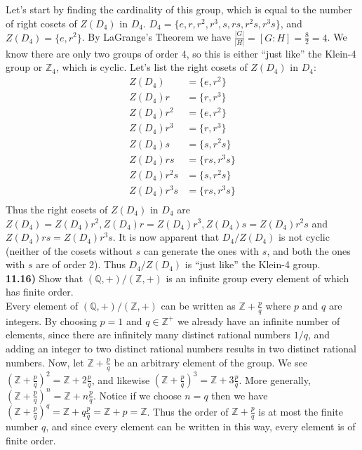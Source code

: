 \documentclass{scrartcl}
\begin{document}
Let's start by finding the cardinality of this group, which is equal to the number of right cosets of $Z(D_4)$ in $D_4$. $D_4=\{e,r,r^2,r^3,s,rs,r^2s,r^3s\}$, and $Z(D_4)=\{e,r^2\}$. By LaGrange's Theorem we have $\frac{|G|}{|H|}=[G:H]=\frac{8}{2}=4$. We know there are only two groups of order 4, so this is either ``just like'' the Klein-4 group or $\mathbb{Z}_4$, which is cyclic. Let's list the right cosets of $Z(D_4)$ in $D_4$:
\begin{align*}
Z(D_4)&=\{e,r^2\}\\
Z(D_4)r&=\{r,r^3\}\\
Z(D_4)r^2&=\{e,r^2\}\\
Z(D_4)r^3&=\{r,r^3\}\\
Z(D_4)s&=\{s,r^2s\}\\
Z(D_4)rs&=\{rs,r^3s\}\\
Z(D_4)r^2s&=\{s,r^2s\}\\
Z(D_4)r^3s&=\{rs,r^3s\}\\
\end{align*}
Thus the right cosets of $Z(D_4)$ in $D_4$ are $Z(D_4)=Z(D_4)r^2, Z(D_4)r=Z(D_4)r^3, Z(D_4)s=Z(D_4)r^2s$ and $Z(D_4)rs=Z(D_4)r^3s$. It is now apparent that $D_4/Z(D_4)$ is not cyclic (neither of the cosets without $s$ can generate the ones with $s$, and both the ones with $s$ are of order 2). Thus $D_4/Z(D_4)$ is ``just like'' the Klein-4 group.\\

\textbf{11.16)} Show that $(\mathbb{Q},+)/(\mathbb{Z},+)$ is an infinite group every element of which has finite order.\\

Every element of $(\mathbb{Q},+)/(\mathbb{Z},+)$ can be written as $\mathbb{Z}+\frac{p}{q}$ where $p$ and $q$ are integers. By choosing $p=1$ and $q \in \mathbb{Z}^+$ we already have an infinite number of elements, since there are infinitely many distinct rational numbers $1/q$, and adding an integer to two distinct rational numbers results in two distinct rational numbers. Now, let $\mathbb{Z}+\frac{p}{q}$ be an arbitrary element of the group. We see $(\mathbb{Z}+\frac{p}{q})^2=\mathbb{Z}+2\frac{p}{q}$, and likewise $(\mathbb{Z}+\frac{p}{q})^3=\mathbb{Z}+3\frac{p}{q}$. More generally, $(\mathbb{Z}+\frac{p}{q})^n=\mathbb{Z}+n\frac{p}{q}$. Notice if we choose $n=q$ then we have $(\mathbb{Z}+\frac{p}{q})^q=\mathbb{Z}+q\frac{p}{q}=\mathbb{Z}+p=\mathbb{Z}$. Thus the order of $\mathbb{Z}+\frac{p}{q}$ is at most the finite number $q$, and since every element can be written in this way, every element is of finite order.\pagebreak
\end{document}
